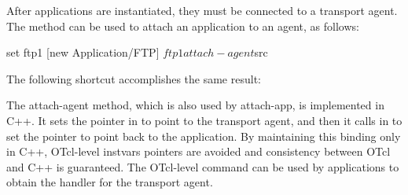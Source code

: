 After applications are instantiated, they must be connected to a transport
agent.  The  method can be used to attach an application
to an agent, as follows:
\begin{program}
        set ftp1 [new Application/FTP]
        $ftp1 attach-agent $src
\end{program}

The following shortcut accomplishes the same result:

The attach-agent method, which is also used by attach-app, is implemented in 
C++.  It sets the 
pointer in  to point to the transport agent, and then
it calls  in  to set the  pointer
to point back to the application.  By maintaining this binding only in C++,
OTcl-level instvars pointers are avoided and consistency between OTcl and C++ 
is guaranteed.  The OTcl-level command  can be used by 
applications to obtain the handler for the transport agent.

